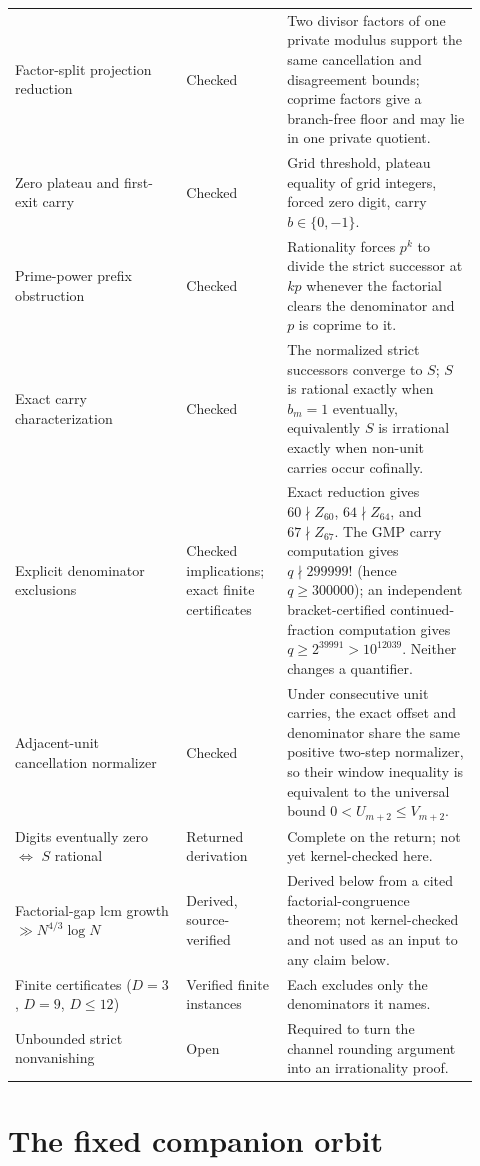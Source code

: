 \documentclass[11pt]{article}
\newcommand{\Ser}{S}
\begin{document}
\begin{longtable}{@{}
  >{\raggedright\arraybackslash}p{0.34\linewidth}
  >{\raggedright\arraybackslash}p{0.20\linewidth}
  >{\raggedright\arraybackslash}p{0.38\linewidth}@{}}
Factor-split projection reduction & Checked & Two divisor factors of one private modulus support the same cancellation and disagreement bounds; coprime factors give a branch-free floor and may lie in one private quotient. \\
Zero plateau and first-exit carry & Checked & Grid threshold, plateau equality of grid integers, forced zero digit, carry $b\in\{0,-1\}$. \\
Prime-power prefix obstruction & Checked & Rationality forces $p^k$ to divide the strict successor at $kp$ whenever the factorial clears the denominator and $p$ is coprime to it. \\
Exact carry characterization & Checked & The normalized strict successors converge to $\Ser$; $\Ser$ is rational exactly when $b_m=1$ eventually, equivalently $\Ser$ is irrational exactly when non-unit carries occur cofinally. \\
Explicit denominator exclusions & Checked implications; exact finite certificates & Exact reduction gives $60\nmid Z_{60}$, $64\nmid Z_{64}$, and $67\nmid Z_{67}$.  The GMP carry computation gives $q\nmid299999!$ (hence $q\ge300000$); an independent bracket-certified continued-fraction computation gives $q\ge2^{39991}>10^{12039}$.  Neither changes a quantifier. \\
Adjacent-unit cancellation normalizer & Checked & Under consecutive unit carries, the exact offset and denominator share the same positive two-step normalizer, so their window inequality is equivalent to the universal bound $0<U_{m+2}\le V_{m+2}$. \\
Digits eventually zero $\iff$ $\Ser$ rational & Returned derivation & Complete on the return; not yet kernel-checked here. \\
Factorial-gap lcm growth $\gg N^{4/3}\log N$ & Derived, source-verified & Derived below from a cited factorial-congruence theorem; not kernel-checked and not used as an input to any claim below. \\
Finite certificates ($D=3$, $D=9$, $D\le12$) & Verified finite instances & Each excludes only the denominators it names. \\
Unbounded strict nonvanishing & Open & Required to turn the channel rounding argument into an irrationality proof. \\
\end{longtable}

\section{The fixed companion orbit}\label{sec:companion-orbit}
\end{document}
